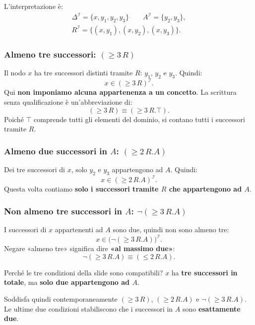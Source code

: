 L'interpretazione è:
\begin{gather*}
    \Delta^{\mathcal I}=\{x,y_1,y_2,y_3\}
    \qquad A^{\mathcal I}=\{y_2,y_3\},\\
    R^{\mathcal I}=\{(x,y_1),(x,y_2),(x,y_3)\}.
\end{gather*}

\subsubsection{Almeno tre successori: \((\geq 3\,R)\)}

Il nodo \(x\) ha tre successori distinti tramite \(R\): \(y_1\), \(y_2\)
e \(y_3\). Quindi:
\[
    x\in(\geq 3\,R)^{\mathcal I}.
\]
Qui \textbf{non imponiamo alcuna appartenenza a un concetto}. La scrittura
senza qualificazione è un'abbreviazione di:
\[
    (\geq 3\,R)\equiv(\geq 3\,R.\top).
\]
Poiché \(\top\) comprende tutti gli elementi del dominio, si contano tutti
i successori tramite \(R\).

\subsubsection{Almeno due successori in \(A\): \((\geq 2\,R.A)\)}

Dei tre successori di \(x\), solo \(y_2\) e \(y_3\) appartengono ad \(A\).
Quindi:
\[
    x\in(\geq 2\,R.A)^{\mathcal I}.
\]
Questa volta contiamo \textbf{solo i successori tramite \(R\) che appartengono
ad \(A\)}.

\subsubsection{Non almeno tre successori in \(A\): \(\neg(\geq 3\,R.A)\)}

I successori di \(x\) appartenenti ad \(A\) sono due, quindi non sono almeno tre:
\[
    x\in\bigl(\neg(\geq 3\,R.A)\bigr)^{\mathcal I}.
\]
Negare «almeno tre» significa dire \textbf{«al massimo due»}:
\[
    \neg(\geq 3\,R.A)\equiv(\leq 2\,R.A).
\]

\begin{observation}{Perché le tre condizioni della slide sono compatibili?}
    \(x\) ha \textbf{tre successori in totale}, ma \textbf{solo due
    appartengono ad \(A\)}.

    Soddisfa quindi contemporaneamente \((\geq 3\,R)\), \((\geq 2\,R.A)\)
    e \(\neg(\geq 3\,R.A)\). Le ultime due condizioni stabiliscono che i
    successori in \(A\) sono \textbf{esattamente due}.
\end{observation}

